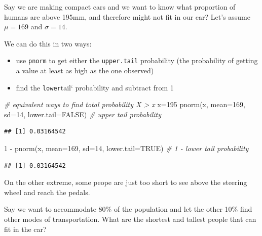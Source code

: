 \documentclass[
]{article}
\newenvironment{Shaded}{\begin{snugshade}}{\end{snugshade}}
\newcommand{\AttributeTok}[1]{\textcolor[rgb]{0.77,0.63,0.00}{#1}}
\newcommand{\CommentTok}[1]{\textcolor[rgb]{0.56,0.35,0.01}{\textit{#1}}}
\newcommand{\ConstantTok}[1]{\textcolor[rgb]{0.00,0.00,0.00}{#1}}
\newcommand{\DecValTok}[1]{\textcolor[rgb]{0.00,0.00,0.81}{#1}}
\newcommand{\FunctionTok}[1]{\textcolor[rgb]{0.00,0.00,0.00}{#1}}
\newcommand{\NormalTok}[1]{#1}
\newcommand{\OtherTok}[1]{\textcolor[rgb]{0.56,0.35,0.01}{#1}}
\newcommand{\SpecialCharTok}[1]{\textcolor[rgb]{0.00,0.00,0.00}{#1}}
\providecommand{\tightlist}{%
  \setlength{\itemsep}{0pt}\setlength{\parskip}{0pt}}
\begin{document}
Say we are making compact cars and we want to know what proportion of
humans are above 195mm, and therefore might not fit in our car? Let's
assume \(\mu = 169\) and \(\sigma = 14\).

We can do this in two ways:

\begin{itemize}
\tightlist
\item
  use \texttt{pnorm} to get either the \texttt{upper.tail} probability
  (the probability of getting a value at least as high as the one
  observed)
\item
  find the \texttt{lower}tail` probability and subtract from 1
\end{itemize}

\begin{Shaded}
\begin{Highlighting}[]
\CommentTok{\# equivalent ways to find total probability X \textgreater{} x}
\NormalTok{x}\OtherTok{=}\DecValTok{195}
\FunctionTok{pnorm}\NormalTok{(x, }\AttributeTok{mean=}\DecValTok{169}\NormalTok{, }\AttributeTok{sd=}\DecValTok{14}\NormalTok{, }\AttributeTok{lower.tail=}\ConstantTok{FALSE}\NormalTok{)     }\CommentTok{\# upper tail probability}
\end{Highlighting}
\end{Shaded}

\begin{verbatim}
## [1] 0.03164542
\end{verbatim}

\begin{Shaded}
\begin{Highlighting}[]
\DecValTok{1} \SpecialCharTok{{-}} \FunctionTok{pnorm}\NormalTok{(x, }\AttributeTok{mean=}\DecValTok{169}\NormalTok{, }\AttributeTok{sd=}\DecValTok{14}\NormalTok{, }\AttributeTok{lower.tail=}\ConstantTok{TRUE}\NormalTok{)  }\CommentTok{\# 1 {-} lower tail probability}
\end{Highlighting}
\end{Shaded}

\begin{verbatim}
## [1] 0.03164542
\end{verbatim}

On the other extreme, some peope are just too short to see above the
steering wheel and reach the pedals.

Say we want to accommodate 80\% of the population and let the other 10\%
find other modes of transportation. What are the shortest and tallest
people that can fit in the car?
\end{document}
